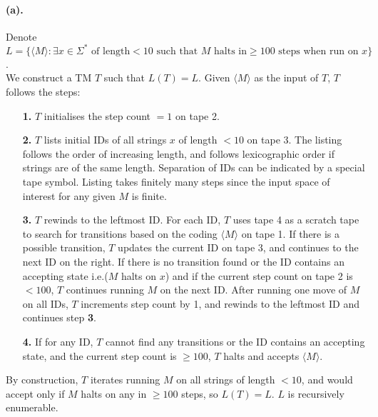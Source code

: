 \documentclass[12pt]{article}
\begin{document}
\paragraph*{(a).} Denote \(L = \{\langle M \rangle : \exists x \in \Sigma^* \text{ of length} < 10 \text{ such that } M \text{ halts in} \geq 100 \text{ steps when run on } x\}\).\\
We construct a TM \(T\) such that \(L(T) = L\). Given \(\langle M \rangle\) as the input of \(T\), \(T\) follows the steps:
\begin{enumerate}
  \item[\textbf{1.}] \(T\) initialises the step count \(= 1\) on tape 2.
  \item[\textbf{2.}] \(T\) lists initial IDs of all strings \(x\) of length \(< 10\) on tape 3. The listing follows the order of increasing length, and follows lexicographic order if strings are of the same length. Separation of IDs can be indicated by a special tape symbol. Listing takes finitely many steps since the input space of interest for any given \(M\) is finite.
  \item[\textbf{3.}] \(T\) rewinds to the leftmost ID. For each ID, \(T\) uses tape 4 as a scratch tape to search for transitions based on the coding \(\langle M \rangle\) on tape 1. If there is a possible transition, \(T\) updates the current ID on tape 3, and continues to the next ID on the right. If there is no transition found or the ID contains an accepting state i.e.(\(M\) halts on \(x\)) and if the current step count on tape 2 is \(< 100\), \(T\) continues running \(M\) on the next ID. After running one move of \(M\) on all IDs, \(T\) increments step count by 1, and rewinds to the leftmost ID and continues step \textbf{3}. 
  \item[\textbf{4.}] If for any ID, \(T\) cannot find any transitions or the ID contains an accepting state, and the current step count is \(\geq 100\), \(T\) halts and accepts \(\langle M \rangle\).
\end{enumerate}
By construction, \(T\) iterates running \(M\) on all strings of length \(< 10\), and would accept only if \(M\) halts on any in \(\geq 100\) steps, so \(L(T) = L\). \(L\) is recursively enumerable.
\end{document}
